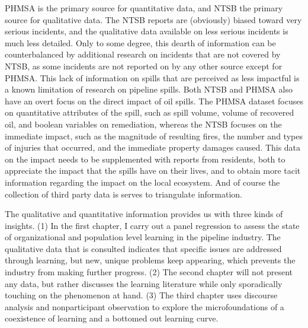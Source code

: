 PHMSA is the primary source for quantitative data, and NTSB the primary source for qualitative data. The NTSB reports are (obviously) biased toward very serious incidents, and the qualitative data available on less serious incidents is much less detailed. Only to some degree, this dearth of information can be counterbalanced by additional research on incidents that are not covered by NTSB, as some incidents are not reported on by any other source except for PHMSA. This lack of information on spills that are perceived as less impactful is a known limitation of research on pipeline spills. Both NTSB and PHMSA also have an overt focus on the direct impact of oil spills. The PHMSA dataset focuses on quantitative attributes of the spill, such as spill volume, volume of recovered oil, and boolean variables on remediation, whereas the NTSB focuses on the immediate impact, such as the magnitude of resulting fires, the number and types of injuries that occurred, and the immediate property damages caused. This data on the impact needs to be supplemented with reports from residents, both to appreciate the impact that the spills have on their lives, and to obtain more tacit information regarding the impact on the local ecosystem. And of course the collection of third party data is serves to triangulate information.


The qualitative and quantitative information provides us with three kinds of insights. (1) In the first chapter, I carry out a panel regression to assess the state of organizational and population level learning in the pipeline industry. The qualitative data that is consulted indicates that specific issues are addressed through learning, but new, unique problems keep appearing, which prevents the industry from making further progress. (2) The second chapter will not present any data, but rather discusses the learning literature while only sporadically touching on the phenomenon at hand. (3) The third chapter uses discourse analysis and nonparticipant observation to explore the microfoundations of a coexistence of learning and a bottomed out learning curve.